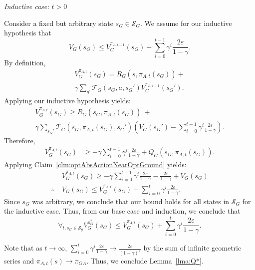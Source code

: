\textit{Inductive case: $t > 0$}

Consider a fixed but arbitrary state $s_G \in \mathcal{S}_G$.
We assume for our inductive hypothesis that
\begin{equation}
V_G(s_G) \leq V_G^{\pi_{A,t-1}}(s_G) + \sum_{i=0}^{t-1}\gamma^i \frac{2\varepsilon}{1-\gamma}.
\end{equation}
By definition,
\begin{multline*}
V_G^{\pi_{A,t}}(s_G) = R_G(s, \pi_{A,t}(s_G)) + \\ \gamma \sum_{g'}\mathcal{T}_G(s_G, a, {s_G}')V_G^{\pi_{A,t-1}}({s_G}').
\end{multline*}
Applying our inductive hypothesis yields:
\begin{multline*}
V_G^{\pi_{A,t}}(s_G) \geq R_G(s_G, \pi_{A,t}(s_G))\ + \\ \gamma \sum_{{s_G}'}\mathcal{T}_G(s_G, \pi_{A,t}(s_G), {s_G}')\left(V_G({s_G}') - \sum_{i=0}^{t-1}\gamma^i \frac{2\varepsilon}{1-\gamma} \right).
\end{multline*}
Therefore,
\begin{align*}
V_G^{\pi_{A,t}}(s_G) &\geq -\gamma\sum_{i=0}^{t-1}\gamma^i \frac{2\varepsilon}{1-\gamma} + Q_G(s_G, \pi_{A,t} (s_G)).
\end{align*}
Applying Claim~\ref{clm:optAbsActionNearOptGround} yields:
\begin{align*}
&V_G^{\pi_{A,t}}(s_G) \geq -\gamma\sum_{i=0}^{t-1}\gamma^i \frac{2\varepsilon}{1-\gamma} - \frac{2\varepsilon}{1-\gamma} + V_{G}(s_G) \\
\therefore\ &V_G(s_G) \leq V_G^{\pi_{A,t}}(s_G)  + \sum_{i=0}^{t}\gamma^i \frac{2\varepsilon}{1-\gamma}.
\end{align*}
Since $s_G$ was arbitrary, we conclude that our bound holds for all states in $\mathcal{S}_G$ for the inductive case.
Thus, from our base case and induction, we conclude that
\begin{equation}
\forall_{t, s_G \in \mathcal{S}_g} V_G^{\pi_G^*}(s_G) \leq  V_G^{\pi_{A,t}}(s_G) + \sum_{i=0}^{t}\gamma^i \frac{2\varepsilon}{1-\gamma}.
\end{equation}

Note that as $t \rightarrow \infty$, $\sum_{i=0}^{t}\gamma^i \frac{2\varepsilon}{1-\gamma} \rightarrow \frac{2\varepsilon}{(1-\gamma)^2}$ by the sum of infinite geometric series and $\pi_{A,t}(s) \rightarrow \pi_{GA}$.
Thus, we conclude Lemma~\ref{lma:Q*}.

